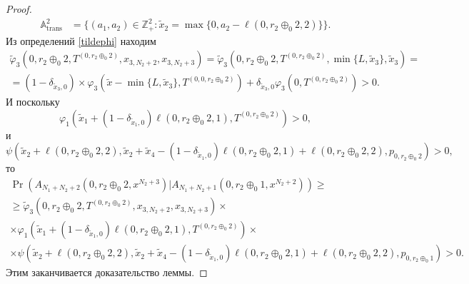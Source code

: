 \begin{proof}
\begin{align*}
{\mathbb A}_{\mathrm{trans}}^2 &= \{(a_1,  a_2) \in \mathbb{Z}_+^2 \colon  \tilde{x}_2 = \max{\{0,  a_2-\ell(0,  r_2 \oplus_0 2,  2)\}}\}.
\end{align*}
Из определений \eqref{tildephi} находим
\begin{multline*}
\widetilde{\varphi}_3(0, r_2 \oplus_0 2,  T^{(0, r_2 \oplus_0 2)},  x_{3,  N_2+2}, x_{3,  N_2+3})= \widetilde{\varphi}_3(0, r_2 \oplus_0 2,  T^{(0, r_2 \oplus_0 2)},  \min\{L,  \tilde{x}_3\},  \tilde{x}_3)=\\
= (1-\delta_{\tilde{x}_3,  0}) \times \varphi_3(\tilde{x} - \min\{L,  \tilde{x}_3\},  T^{(0,  0, r_2 \oplus_0 2)} ) + \delta_{\tilde{x}_3,  0} \varphi_3 (0,  T^{(0, r_2 \oplus_0 2)})  > 0.
\end{multline*}
И поскольку 
\begin{equation*}
\varphi_1(  \tilde{x}_1 + (1 - \delta_{\tilde{x}_1, 0})\ell(0,  r_2 \oplus_0 2,  1),  T^{(0,  r_2 \oplus_0 2)}) > 0, 
\end{equation*}
и 
\begin{equation*}
    \psi(\tilde{x}_2 + \ell(0,  r_2 \oplus_0 2,  2),  \tilde{x}_2 + \tilde{x}_4 - (1 - \delta_{\tilde{x}_1, 0})\ell(0, r_2 \oplus_0 2, 1) + \ell(0,  r_2 \oplus_0 2, 2),  p_{0,  r_2 \oplus_0 2}) > 0, 
\end{equation*}
то
\begin{multline*}
\Pr( A_{N_1 + N_2 + 2} (0,  r_2 \oplus_0 2,  x^{N_2+3})
|A_{N_1 + N_2+1} (0,  r_2 \oplus_0 1,  x^{N_2 + 2}) )
\geqslant \\
\geqslant \widetilde{\varphi}_3(0, r_2 \oplus_0 2,  T^{(0, r_2 \oplus_0 2)},  x_{3,  N_2 + 2}, x_{3,  N_2 + 3})
\times \\
\times \varphi_1(  \tilde{x}_1 + (1 - \delta_{\tilde{x}_1, 0})\ell(0,  r_2 \oplus_0 2,  1),  T^{(0,  r_2 \oplus_0 2)}) \times \\
\times \psi(\tilde{x}_2 + \ell(0,  r_2 \oplus_0 2,  2),  \tilde{x}_2 + \tilde{x}_4 - (1 - \delta_{\tilde{x}_1, 0})\ell(0, r_2 \oplus_0 2, 1) + \ell(0,  r_2 \oplus_0 2, 2),  p_{0,  r_2 \oplus_0 1})  > 0.
\end{multline*}
Этим заканчивается доказательство леммы.

\end{proof}
























